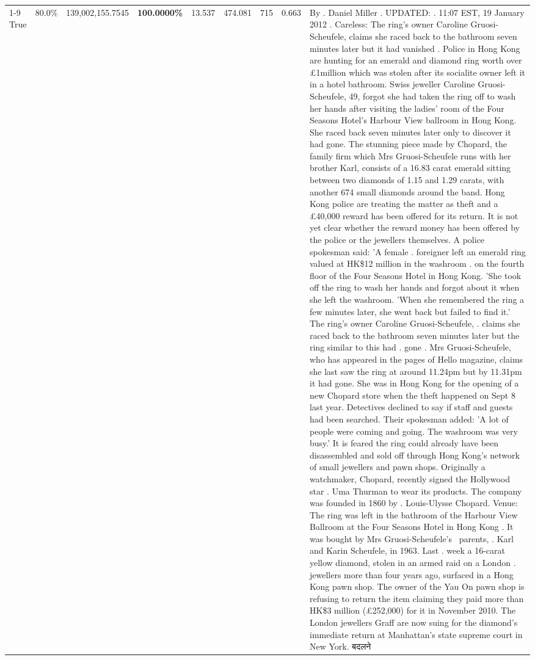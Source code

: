 \begin{table}[H]
\begin{tabular}{lllrlllll}
\cline{1-9}
True & 80.0\% & 139,002,155.7545 & \bfseries \color{red} 100.0000\% & 13.537 & 474.081 & 715 & 0.663 & By . Daniel Miller . UPDATED: . 11:07 EST, 19 January 2012 . Careless: The ring's owner Caroline Gruosi-Scheufele, claims she raced back to the bathroom seven minutes later but it had vanished . Police in Hong Kong are hunting for an emerald and diamond ring worth over £1million which was stolen after its socialite owner left it in a hotel bathroom. Swiss jeweller Caroline Gruosi-Scheufele, 49, forgot she had taken the ring off to wash her hands after visiting the ladies' room of the Four Seasons Hotel's Harbour View ballroom in Hong Kong. She raced back seven minutes later only to discover it had gone. The stunning piece made by Chopard, the family firm which Mrs Gruosi-Scheufele runs with her brother Karl, consists of a 16.83 carat emerald sitting between two diamonds of 1.15 and 1.29 carats, with another 674 small diamonds around the band. Hong Kong police are treating the matter as theft and a £40,000 reward has been offered for its return. It is not yet clear whether the reward money has been offered by the police or the jewellers themselves. A police spokesman said: 'A female . foreigner left an emerald ring valued at HK\$12 million in the washroom . on the fourth floor of the Four Seasons Hotel in Hong Kong. 'She took off the ring to wash her hands and forgot about it when she left the washroom. 'When she remembered the ring a few minutes later, she went back but failed to find it.' The ring's owner Caroline Gruosi-Scheufele, . claims she raced back to the bathroom seven minutes later but the ring similar to this had . gone . Mrs Gruosi-Scheufele, who has appeared in the pages of Hello magazine, claims she last saw the ring at around 11.24pm but by 11.31pm it had gone. She was in Hong Kong for the opening of a new Chopard store when the theft happened on Sept 8 last year. Detectives declined to say if staff and guests had been searched. Their spokesman added: 'A lot of people were coming and going. The washroom was very busy.' It is feared the ring could already have been disassembled and sold off through Hong Kong's network of small jewellers and pawn shops. Originally a watchmaker, Chopard, recently signed the Hollywood star . Uma Thurman to wear its products. The company was founded in 1860 by . Louis-Ulysse Chopard. Venue: The ring was left in the bathroom of the Harbour View Ballroom at the Four Seasons Hotel in Hong Kong . It was bought by Mrs Gruosi-Scheufele's  parents, . Karl and Karin Scheufele, in 1963. Last . week a 16-carat yellow diamond, stolen in an armed raid on a London . jewellers more than four years ago, surfaced in a Hong Kong pawn shop. The owner of the Yau On pawn shop is refusing to return the item claiming they paid more than HK\$3 million (£252,000) for it in November 2010. The London jewellers Graff are now suing for the diamond’s immediate return at Manhattan’s state supreme court in New York. बदलने \\

\end{tabular}
\end{table}
